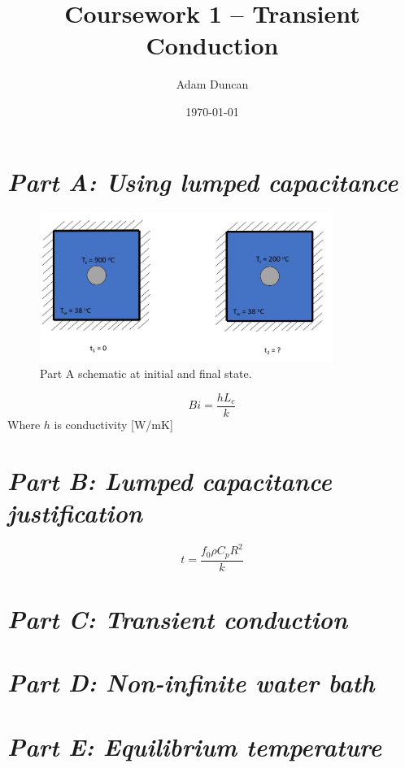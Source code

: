 \documentclass[11pt]{article}
\title{Coursework 1 – Transient Conduction}
\author{Adam Duncan}
\date{\today}
\begin{document}
\maketitle

\section{\emph{Part A: Using lumped capacitance}}
\begin{figure}[h]
    \centering
    \includegraphics[width=0.85\textwidth]{part_a_fig}
    \caption{Part A schematic at initial and final state.}
    \label{fig:schem_a}
\end{figure}

\begin{equation}
    Bi = \frac{h L_{c}}{k}
\end{equation}
Where $h$ is conductivity [W/mK]

\section{\emph{Part B: Lumped capacitance justification}}
\begin{equation}
t=\frac{f_{0} \rho C_{p} R^{2}}{k}
\end{equation}
\section{\emph{Part C: Transient conduction}}

\section{\emph{Part D: Non-infinite water bath}}

\section{\emph{Part E: Equilibrium temperature}}
\end{document}
